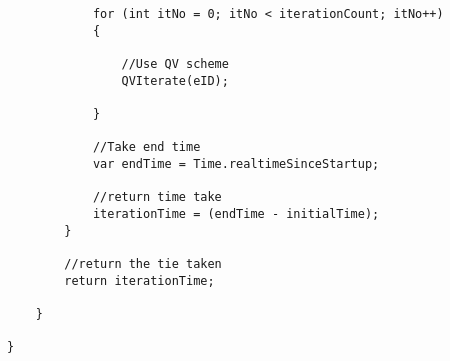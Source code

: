 \begin{mdframed}[linecolor=black, topline=true, bottomline=true,
  leftline=false, rightline=false]
\begin{verbatim}
            for (int itNo = 0; itNo < iterationCount; itNo++)
            {

                //Use QV scheme
                QVIterate(eID);

            }

            //Take end time
            var endTime = Time.realtimeSinceStartup;

            //return time take
            iterationTime = (endTime - initialTime);
        }

        //return the tie taken
        return iterationTime;

    }

}
\end{verbatim}
\end{mdframed}
